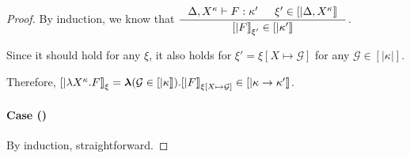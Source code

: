 \begin{proof}
By induction, we know that 
$ \inference{\Delta,X^\kappa |- F:\kappa' & \xi'\in[|\Delta,X^\kappa|]}
        {[|F|]_{\xi'} \in [|\kappa'|]} $.

Since it should hold for any $\xi$, it also holds for
$\xi'=\xi[X\mapsto\mathcal{G}]$ for any $\mathcal{G}\in[|\kappa|]$.

Therefore,
$  [|\lambda X^\kappa.F|]_\xi
 = \boldsymbol\lambda(\mathcal{G}\in[|\kappa|]).[|F|]_{\xi[X\mapsto\mathcal{G}]}
        \in [|\kappa -> \kappa'|]$.

\paragraph{Case ()} By induction, straightforward.
\end{proof}


